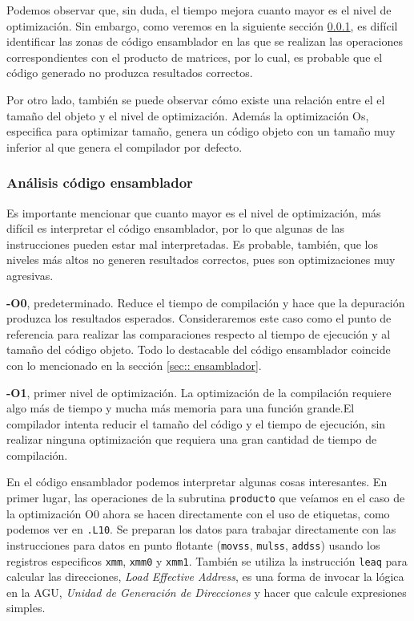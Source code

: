 \documentclass[10pt,a4paper]{article}
\begin{document}
Podemos observar que, sin duda, el tiempo mejora cuanto mayor es el nivel de optimización. Sin embargo, como veremos en la siguiente sección \ref{seec:: codigoens}, es difícil identificar las zonas de código ensamblador en las que se realizan las operaciones correspondientes con el producto de matrices, por lo cual, es probable que el código generado no produzca resultados correctos. 

Por otro lado, también se puede observar cómo existe una relación entre el el tamaño del objeto y el nivel de optimización. Además la optimización Os, especifica para optimizar tamaño, genera un código objeto con un tamaño muy inferior al que genera el compilador por defecto. 

\subsubsection{Análisis código ensamblador}\label{seec:: codigoens}
Es importante mencionar que cuanto mayor es el nivel de optimización, más difícil es interpretar el código ensamblador, por lo que algunas de las instrucciones pueden estar mal interpretadas. Es probable, también, que los niveles más altos no generen resultados correctos, pues son optimizaciones muy agresivas. 

\textbf{-O0}, predeterminado. Reduce el tiempo de compilación y hace que la depuración produzca los resultados esperados. Consideraremos este caso como el punto de referencia para realizar las comparaciones respecto al tiempo de ejecución y al tamaño del código objeto. Todo lo destacable del código ensamblador coincide con lo mencionado en la sección \ref{sec:: ensamblador}.

\textbf{-O1}, primer nivel de optimización. La optimización de la compilación requiere algo más de tiempo y mucha más memoria para una función grande.El compilador intenta reducir el tamaño del código y el tiempo de ejecución, sin realizar ninguna optimización que requiera una gran cantidad de tiempo de compilación. 

En el código ensamblador podemos interpretar algunas cosas interesantes. En primer lugar, las operaciones de la subrutina \texttt{producto} que veíamos en el caso de la optimización O0 ahora se hacen directamente con el uso de etiquetas, como podemos ver en \texttt{.L10}. Se preparan los datos para trabajar directamente con las instrucciones para datos en punto flotante (\texttt{movss}, \texttt{mulss}, \texttt{addss}) usando los registros especificos \texttt{xmm}, \texttt{xmm0} y \texttt{xmm1}. También se utiliza la instrucción \texttt{leaq} para calcular las direcciones, \textit{Load Effective Address}, es una forma de invocar la lógica en la AGU, \textit{Unidad de Generación de Direcciones} y hacer que calcule expresiones simples. 
\end{document}
